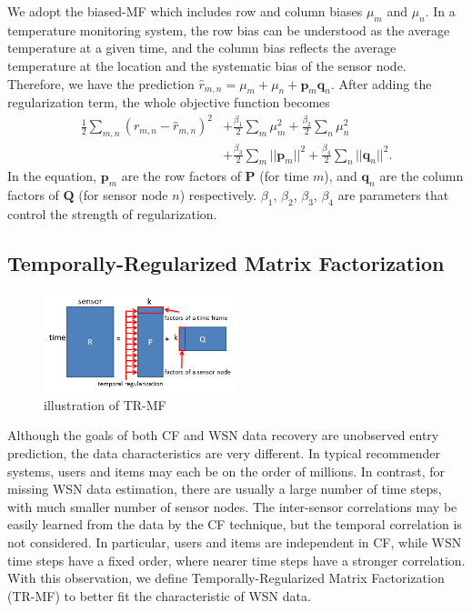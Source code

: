 We adopt the biased-MF which includes row and column biases $\mu_m$ and $\mu_n$. %
In a temperature monitoring system, the row bias can be understood as the average temperature at a given time, and the column bias reflects the average temperature at the location and the systematic bias of the sensor node.
Therefore, we have the prediction $\hat{r}_{m,n} = \mu_m + \mu_n + \mathbf{p}_m \mathbf{q}_n$.
After adding the regularization term, the whole objective function becomes
\begin{equation*}\begin{aligned}
\frac{1}{2}\sum_{m,n}{(r_{m,n} - \hat{r}_{m,n})}^2 & + \frac{\beta_1}{2}\sum_m{\mu_m^2} + \frac{\beta_2}{2}\sum_n{\mu_n^2}\\
& + \frac{\beta_3}{2}\sum_m{||\mathbf{p}_m||^2} + \frac{\beta_4}{2}\sum_n{||\mathbf{q}_n||^2}.
\end{aligned}\end{equation*}
In the equation, $\mathbf{p}_m$ are the row factors of $\mathbf{P}$ (for time $m$), and $\mathbf{q}_n$ are the column factors of $\mathbf{Q}$ (for sensor node $n$) respectively.
$\beta_1$, $\beta_2$, $\beta_3$, $\beta_4$ are parameters that control the strength of regularization.

\subsection{Temporally-Regularized Matrix Factorization}

\begin{figure}[htbp]
	\centering
	\includegraphics[width=0.5\textwidth]{TRMF_illustration.png}
	\caption{illustration of TR-MF}
\end{figure}


Although the goals of both CF and WSN data recovery are unobserved entry prediction, the data characteristics are very different.
In typical recommender systems, users and items may each be on the order of millions.
In contrast, for missing WSN data estimation, there are usually a large number of time steps, with much smaller number of sensor nodes.
The inter-sensor correlations may be easily learned from the data by the CF technique, but the temporal correlation is not considered.
In particular, users and items are independent in CF, while WSN time steps have a fixed order, where nearer time steps have a stronger correlation.
With this observation, we define Temporally-Regularized Matrix Factorization (TR-MF) to better fit the characteristic of WSN data. 

